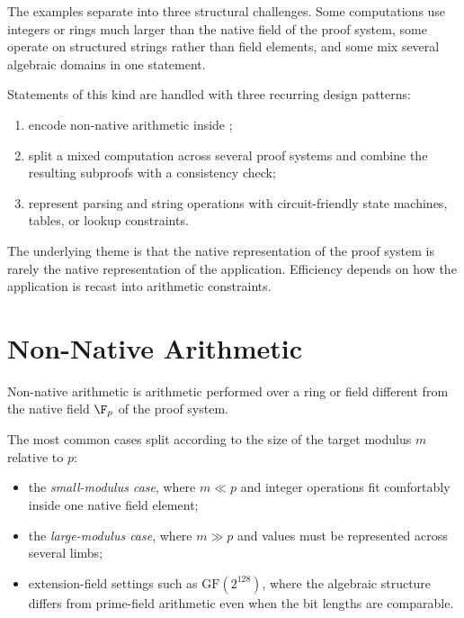\documentclass[11pt]{article}
\begin{document}
The examples separate into three structural challenges.  Some computations use
integers or rings much larger than the native field of the proof system, some
operate on structured strings rather than field elements, and some mix several
algebraic domains in one statement.

\begin{highlight}[title={Three Structural Strategies}]
Statements of this kind are handled with three recurring design patterns:
\begin{enumerate}
  \item encode non-native arithmetic inside ;
  \item split a mixed computation across several proof systems and combine the
        resulting subproofs with a consistency check;
  \item represent parsing and string operations with circuit-friendly state
        machines, tables, or lookup constraints.
\end{enumerate}
\end{highlight}

The underlying theme is that the native representation of the proof system is
rarely the native representation of the application.  Efficiency depends on how
the application is recast into arithmetic constraints.

\section{Non-Native Arithmetic}

\begin{definition}
Non-native arithmetic is arithmetic performed over a ring or field different
from the native field $\F_p$ of the proof system.
\end{definition}

The most common cases split according to the size of the target modulus $m$
relative to $p$:
\begin{itemize}
  \item the \emph{small-modulus case}, where $m \ll p$ and integer operations
        fit comfortably inside one native field element;
  \item the \emph{large-modulus case}, where $m \gg p$ and values must be
        represented across several limbs;
  \item extension-field settings such as $\mathrm{GF}(2^{128})$, where the
        algebraic structure differs from prime-field arithmetic even when the
        bit lengths are comparable.
\end{itemize}
\end{document}
